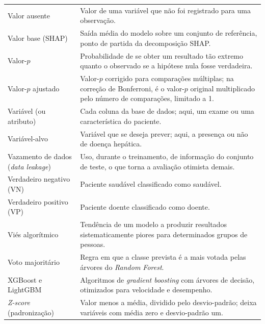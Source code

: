\begin{longtable}{@{}p{3.8cm}p{10.7cm}@{}}
Valor ausente & Valor de uma variável que não foi registrado para uma observação. \\[0.15cm]
Valor base (SHAP) & Saída média do modelo sobre um conjunto de referência, ponto de partida da decomposição SHAP. \\[0.15cm]
Valor-$p$ & Probabilidade de se obter um resultado tão extremo quanto o observado se a hipótese nula fosse verdadeira. \\[0.15cm]
Valor-$p$ ajustado & Valor-$p$ corrigido para comparações múltiplas; na correção de Bonferroni, é o valor-$p$ original multiplicado pelo número de comparações, limitado a 1. \\[0.15cm]
Variável (ou atributo) & Cada coluna da base de dados; aqui, um exame ou uma característica do paciente. \\[0.15cm]
Variável-alvo & Variável que se deseja prever; aqui, a presença ou não de doença hepática. \\[0.15cm]
Vazamento de dados (\textit{data leakage}) & Uso, durante o treinamento, de informação do conjunto de teste, o que torna a avaliação otimista demais. \\[0.15cm]
Verdadeiro negativo (VN) & Paciente saudável classificado como saudável. \\[0.15cm]
Verdadeiro positivo (VP) & Paciente doente classificado como doente. \\[0.15cm]
Viés algorítmico & Tendência de um modelo a produzir resultados sistematicamente piores para determinados grupos de pessoas. \\[0.15cm]
Voto majoritário & Regra em que a classe prevista é a mais votada pelas árvores do \textit{Random Forest}. \\[0.15cm]
XGBoost e LightGBM & Algoritmos de \textit{gradient boosting} com árvores de decisão, otimizados para velocidade e desempenho. \\[0.15cm]
\textit{Z-score} (padronização) & Valor menos a média, dividido pelo desvio-padrão; deixa variáveis com média zero e desvio-padrão um. \\
\end{longtable}

